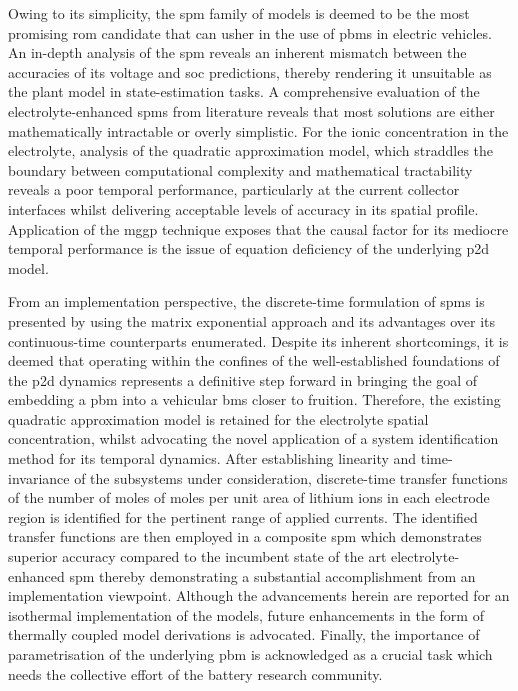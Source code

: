 Owing to its simplicity, the \gls{spm} family of models is deemed to be the most
promising  \gls{rom} candidate  that  can usher  in the  use  of \glspl{pbm}  in
electric vehicles.  An in-depth  analysis of the  \gls{spm} reveals  an inherent
mismatch  between  the accuracies  of  its  voltage and  \gls{soc}  predictions,
thereby rendering it unsuitable as the  plant model in state-estimation tasks. A
comprehensive evaluation of the electrolyte-enhanced \glspl{spm} from literature
reveals  that most  solutions are  either mathematically  intractable or  overly
simplistic.  For  the  ionic  concentration  in  the  electrolyte,  analysis  of
the  quadratic  approximation  model,   which  straddles  the  boundary  between
computational complexity  and mathematical tractability reveals  a poor temporal
performance, particularly at the  current collector interfaces whilst delivering
acceptable  levels  of accuracy  in  its  spatial  profile. Application  of  the
\gls{mggp} technique  exposes that the  causal factor for its  mediocre temporal
performance  is the  issue of  equation deficiency  of the  underlying \gls{p2d}
model.

From an implementation perspective, the discrete-time formulation of \glspl{spm}
is presented  by using the matrix  exponential approach and its  advantages over
its continuous-time counterparts enumerated.  Despite its inherent shortcomings,
it  is  deemed  that  operating  within the  confines  of  the  well-established
foundations  of the  \gls{p2d}  dynamics represents  a  definitive step  forward
in  bringing the  goal  of  embedding a  \gls{pbm}  into  a vehicular  \gls{bms}
closer to  fruition. Therefore,  the existing  quadratic approximation  model is
retained for the electrolyte spatial  concentration, whilst advocating the novel
application  of  a  system  identification method  for  its  temporal  dynamics.
After  establishing  linearity  and  time-invariance  of  the  subsystems  under
consideration, discrete-time transfer functions of  the number of moles of moles
per unit  area of lithium  ions in each electrode  region is identified  for the
pertinent range of applied currents.  The identified transfer functions are then
employed in a composite \gls{spm}  which demonstrates superior accuracy compared
to  the  incumbent  state  of the  art  electrolyte-enhanced  \gls{spm}  thereby
demonstrating  a substantial  accomplishment from  an implementation  viewpoint.
Although the advancements  herein are reported for  an isothermal implementation
of  the models,  future  enhancements in  the form  of  thermally coupled  model
derivations  is advocated.  Finally, the  importance of  parametrisation of  the
underlying  \gls{pbm}  is  acknowledged  as  a  crucial  task  which  needs  the
collective effort of the battery research community.







